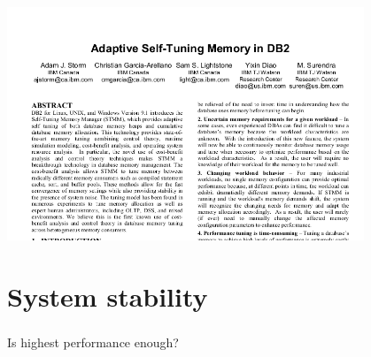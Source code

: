 \documentclass[usenames,dvipsnames, 18pt, compress, aspectratio=169]{beamer}
\begin{document}
\begin{frame}[fragile]{}
    \frametitle{}
    \begin{center}

        \includegraphics[width=0.8\textwidth,center]{db2.png}

    \end{center}
\end{frame}

\section{System stability}

\begin{frame}[fragile]{}
    \frametitle{}
    \begin{center}

        Is highest performance enough?

    \end{center}
\end{frame}
\end{document}
